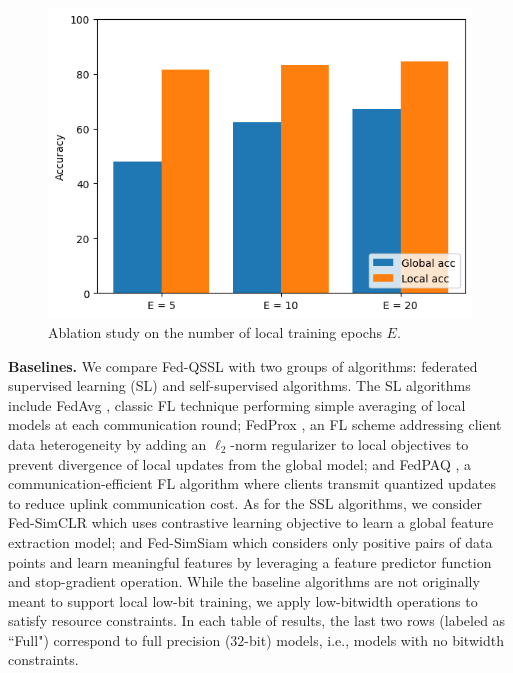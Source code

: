 \begin{figure}
\begin{minipage}[t]{0.3\textwidth}
  \includegraphics[width=\linewidth]{ab_study_3.png}
  \caption{Ablation study on the number of local training epochs $E$.}
  \label{fig:third}
\end{minipage}%
\end{figure}

{\bf Baselines.} We compare Fed-QSSL with two groups of algorithms: federated supervised learning (SL) and self-supervised algorithms. The SL algorithms include FedAvg \cite{mcmahan2017communication}, classic FL technique performing simple averaging of local models at each communication round; FedProx \cite{li2020federated}, an FL scheme addressing client data heterogeneity by adding an $\ell_2$-norm regularizer to local objectives to prevent divergence of local updates from the global model; and FedPAQ \cite{reisizadeh2020fedpaq}, a communication-efficient FL algorithm where clients transmit quantized updates to reduce uplink communication cost. As for the SSL algorithms, we consider Fed-SimCLR \cite{chen2020simple,wang2022does} which uses contrastive learning objective to learn a global feature extraction model; and Fed-SimSiam \cite{chen2021exploring} which considers only positive pairs of data points and learn meaningful features by leveraging a feature predictor function and stop-gradient operation. While the baseline algorithms are not originally meant to support local low-bit training, we apply low-bitwidth operations to satisfy resource constraints. In each table of results, the last two rows (labeled as ``Full") correspond to full precision ($32$-bit) models, i.e., models with no bitwidth constraints. 

